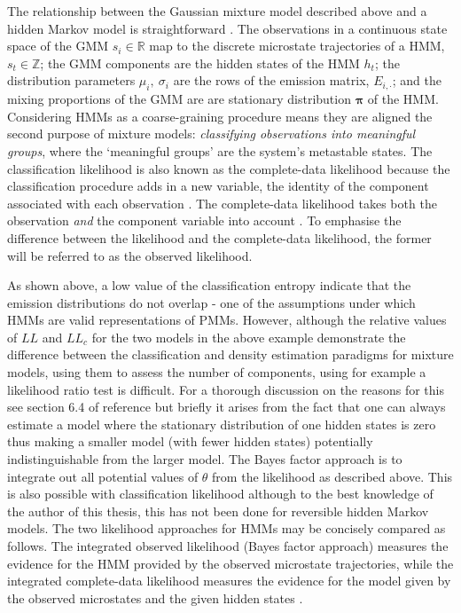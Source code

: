 The relationship between the Gaussian mixture model described above and a hidden Markov model is straightforward \cite{mclachlanFiniteMixtureModels2000}. The observations in a continuous state space of the GMM $s_{i} \in \mathbb{R}$ map to the discrete microstate trajectories of a HMM, $s_{t} \in \mathbb{Z}$; the GMM components are the hidden states of the HMM $h_{t}$; the distribution parameters $\mu_{i},\ \sigma_{i}$ are the rows of the emission matrix, $E_{i, \cdot}$; and the mixing proportions of the GMM are are stationary distribution $\bm{\pi}$ of the HMM. Considering HMMs as a coarse-graining procedure means they are aligned the second purpose of mixture models: \emph{classifying observations into meaningful groups}, where the `meaningful groups' are the system's metastable states. The classification likelihood is also known as the complete-data likelihood because the classification procedure adds in a new variable, the identity of the component associated with each observation \cite{mclachlanFiniteMixtureModels2000}. The complete-data likelihood takes both the observation \emph{and} the component variable into account \cite{mclachlan1988mixture}. To emphasise the difference between the likelihood and the complete-data likelihood, the former will be referred to as the observed likelihood.  

As shown above, a low value of the classification entropy indicate that the emission distributions do not overlap - one of the assumptions under which HMMs are valid representations of PMMs. However, although the relative values of $LL$ and $LL_{c}$ for the two models in the above example demonstrate the difference between the classification and density estimation paradigms for mixture models, using them to assess the number of components, using for example a likelihood ratio test \cite{wasserman2013all} is difficult. For a thorough discussion on the reasons for this see section 6.4 of reference \cite{mclachlanFiniteMixtureModels2000} but briefly it arises from the fact that one can always estimate a model where the stationary distribution of one hidden states is zero thus making a smaller model (with fewer hidden states) potentially indistinguishable from the larger model. The Bayes factor approach is to integrate out all potential values of $\theta$ from the likelihood as described above. This is also possible with classification likelihood \cite{latoucheBayesianMethodsGraph2010} although to the best knowledge of the author of this thesis, this has not been done for reversible hidden Markov models. The two likelihood approaches for HMMs may be concisely compared as follows. The integrated observed likelihood (Bayes factor approach) measures the evidence for the HMM provided by the observed microstate trajectories, while the integrated complete-data likelihood measures the evidence for the model  given by the observed microstates and the given hidden states \cite{biernackiAssessingMixtureModel2000a, celeuxSelectingHiddenMarkov2008}. 


